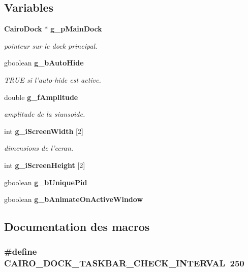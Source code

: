 \subsection*{Variables}
\begin{CompactItemize}
\item 
{\bf Cairo\-Dock} $\ast$ {\bf g\_\-p\-Main\-Dock}
\begin{CompactList}\small\item\em pointeur sur le dock principal. \item\end{CompactList}\item 
gboolean {\bf g\_\-b\-Auto\-Hide}
\begin{CompactList}\small\item\em TRUE si l'auto-hide est active. \item\end{CompactList}\item 
double {\bf g\_\-f\-Amplitude}
\begin{CompactList}\small\item\em amplitude de la siunsoide. \item\end{CompactList}\item 
int {\bf g\_\-i\-Screen\-Width} [2]
\begin{CompactList}\small\item\em dimensions de l'ecran. \item\end{CompactList}\item 
int {\bf g\_\-i\-Screen\-Height} [2]
\item 
gboolean {\bf g\_\-b\-Unique\-Pid}
\item 
gboolean {\bf g\_\-b\-Animate\-On\-Active\-Window}
\end{CompactItemize}


\subsection{Documentation des macros}
\subsubsection{\setlength{\rightskip}{0pt plus 5cm}\#define CAIRO\_\-DOCK\_\-TASKBAR\_\-CHECK\_\-INTERVAL~250}\label{cairo-dock-applications-manager_8c_2eca6cb91e1d8de16029f465005ada36}




